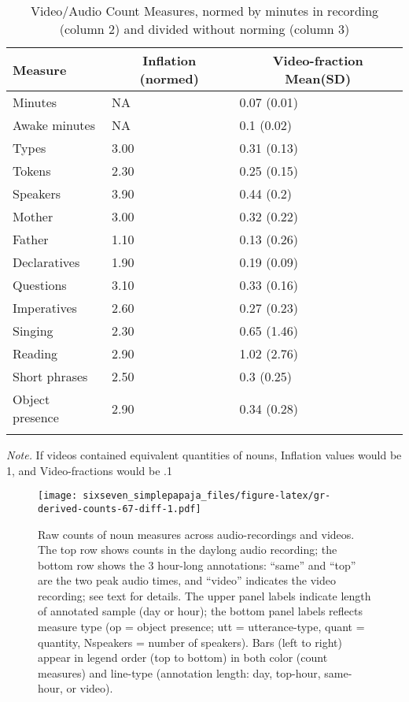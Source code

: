 \documentclass[man]{apa6}
\theoremstyle{definition}
\theoremstyle{definition}
\theoremstyle{definition}
\theoremstyle{remark}
\begin{document}
\begin{table}[tbp]
\begin{center}
\begin{threeparttable}
\caption{\label{tab:normtable}Video/Audio Count Measures, normed by minutes in recording (column 2) and divided without norming (column 3)}
\small{
\begin{tabular}{lll}
\toprule
Measure & \multicolumn{1}{c}{Inflation (normed)} & \multicolumn{1}{c}{Video-fraction Mean(SD)}\\
\midrule
Minutes & NA & 0.07 (0.01)\\
Awake minutes & NA & 0.1 (0.02)\\
Types & 3.00 & 0.31 (0.13)\\
Tokens & 2.30 & 0.25 (0.15)\\
Speakers & 3.90 & 0.44 (0.2)\\
Mother & 3.00 & 0.32 (0.22)\\
Father & 1.10 & 0.13 (0.26)\\
Declaratives & 1.90 & 0.19 (0.09)\\
Questions & 3.10 & 0.33 (0.16)\\
Imperatives & 2.60 & 0.27 (0.23)\\
Singing & 2.30 & 0.65 (1.46)\\
Reading & 2.90 & 1.02 (2.76)\\
Short phrases & 2.50 & 0.3 (0.25)\\
Object presence & 2.90 & 0.34 (0.28)\\
\bottomrule
\addlinespace
\end{tabular}
}
\begin{tablenotes}[para]
\textit{Note.} If videos contained equivalent quantities of nouns, Inflation values would be 1, and Video-fractions would be .1
\end{tablenotes}
\end{threeparttable}
\end{center}
\end{table}

\begin{figure}
\centering
\texttt{[image: sixseven\_simplepapaja\_files/figure-latex/gr-derived-counts-67-diff-1.pdf]}
\caption{\label{fig:gr-derived-counts-67-diff}Raw counts of noun measures
across audio-recordings and videos. The top row shows counts in the
daylong audio recording; the bottom row shows the 3 hour-long
annotations: \enquote{same} and \enquote{top} are the two peak audio
times, and \enquote{video} indicates the video recording; see text for
details. The upper panel labels indicate length of annotated sample (day
or hour); the bottom panel labels reflects measure type (op = object
presence; utt = utterance-type, quant = quantity, Nspeakers = number of
speakers). Bars (left to right) appear in legend order (top to bottom)
in both color (count measures) and line-type (annotation length: day,
top-hour, same-hour, or video).}
\end{figure}
\end{document}
